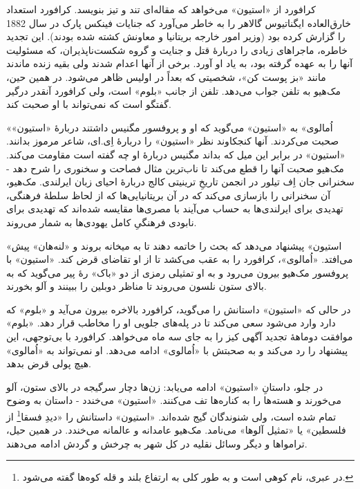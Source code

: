 \documentclass[12pt]{book}
\newcommand{\noun}[1]{«{#1}»}
\begin{document}
    کرافورد از \noun{استیون} می‌خواهد که مقاله‌ای تند و تیز بنویسد. کرافورد استعداد خارق‌العاده ایگناتیوس گالاهر را به خاطر می‌آورد که جنایات فینکس پارک در سال 1882 را گزارش کرده بود (وزیر امور خارجه بریتانیا و معاونش کشته شده بودند). این تجدید خاطره، ماجراهای زیادی را دربارۀ قتل و جنایت و گروه شکست‌ناپذیران، که مسئولیت آنها را به عهده گرفته بود، به یاد او آورد. برخی از آنها اعدام شدند ولی بقیه زنده ماندند مانند «بز پوست کن»، شخصیتی که بعداً در اولیس ظاهر می‌شود. در همین حین، مک‌هیو به تلفن جواب می‌دهد. تلفن از جانب \noun{بلوم} است، ولی کرافورد آنقدر درگیر گفتگو است که نمی‌تواند با او صحبت کند.

    \noun{اُمالوی} به \noun{استیون} می‌گوید که او و پروفسور مگنیس داشتند دربارۀ \noun{استیون} صحبت می‌کردند. آنها کنجکاوند نظر \noun{استیون} را دربارۀ اِی.ای، شاعر مرموز بدانند. \noun{استیون} در برابر این میل که بداند مگنیس دربارۀ او چه گفته است مقاومت می‌کند. مک‌هیو صحبت آنها را قطع می‌کند تا ناب‌ترین مثال فصاحت و سخنوری را شرح دهد - سخنرانی جان اِف تیلور در انجمن تاریخِ ترینیتی کالج  دربارۀ احیای زبان ایرلندی. مک‌هیو، آن سخنرانی را بازسازی می‌کند که در آن بریتانیایی‌ها که از لحاظ سلطۀ فرهنگی، تهدیدی برای ایرلندی‌ها به حساب می‌آیند با مصری‌ها مقایسه شده‌اند که تهدیدی برای نابودی فرهنگیِ کامل یهودی‌ها به شمار می‌روند.

    \noun{استیون} پیشنهاد می‌دهد که بحث را خاتمه دهند تا به میخانه بروند و \noun{لنه‌هان} پیش می‌افتد. \noun{اُمالوی}، کرافورد را به عقب می‌کشد تا از او تقاضای قرض کند. \noun{استیون} با پروفسور مک‌هیو بیرون می‌رود و به او تمثیلی رمزی از دو \noun{باک} رۀ پیر می‌گوید که به بالای ستون نلسون می‌روند تا مناظر دوبلین را ببینند و آلو بخورند.

    در حالی که \noun{استیون} داستانش را می‌گوید، کرافورد بالاخره بیرون می‌آید و \noun{بلوم} که دارد وارد می‌شود سعی می‌کند تا در پله‌های جلویی او را مخاطب قرار دهد. \noun{بلوم} موافقت دوماهۀ تجدید آگهی کیز را به جای سه ماه می‌خواهد. کرافورد با بی‌توجهی، این پیشنهاد را رد می‌کند و به صحبتش با \noun{اُمالوی} ادامه می‌دهد. او نمی‌تواند به \noun{اُمالوی} هیچ پولی قرض بدهد.

    در جلو، داستانِ \noun{استیون} ادامه می‌یابد: زن‌ها دچار سرگیجه در بالای ستون، آلو می‌خورند و هسته‌ها را به کناره‌ها تف می‌کنند. \noun{استیون} می‌خندد - داستان به وضوح تمام شده است، ولی شنوندگان گیج شده‌اند. \noun{استیون} داستانش را «دیدِ فسقا\footnote{در عبری، نام کوهی است و به طور کلی به ارتفاع بلند و قله کوه‌ها گفته می‌شود.} از فلسطین» یا «تمثیل آلوها» می‌نامد. مک‌هیو عامدانه و عالمانه می‌خندد. در همین حیل، ترامواها و دیگر وسائل نقلیه در کل شهر به چرخش و گردش ادامه می‌دهند.
\end{document}
